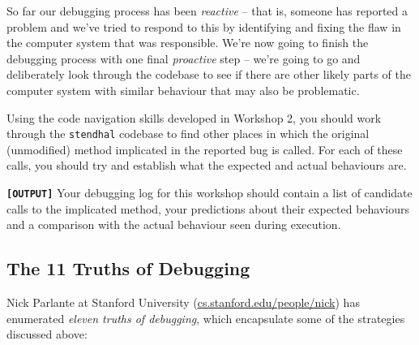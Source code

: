 \documentclass[
]{book}
\begin{document}
So far our debugging process has been \emph{reactive} -- that is, someone has reported a problem and we've tried to respond to this by identifying and fixing the flaw in the computer system that was responsible. We're now going to finish the debugging process with one final \emph{proactive} step -- we're going to go and deliberately look through the codebase to see if there are other likely parts of the computer system with similar behaviour that may also be problematic.

Using the code navigation skills developed in Workshop 2, you should work through the \texttt{stendhal} codebase to find other places in which the original (unmodified) method implicated in the reported bug is called. For each of these calls, you should try and establish what the expected and actual behaviours are.

\textbf{\texttt{{[}OUTPUT{]}}} Your debugging log for this workshop should contain a list of candidate calls to the implicated method, your predictions about their expected behaviours and a comparison with the actual behaviour seen during execution.

\hypertarget{truths}{%
\subsection{The 11 Truths of Debugging}\label{truths}}

Nick Parlante at Stanford University (\href{https://cs.stanford.edu/people/nick/}{cs.stanford.edu/people/nick}) has enumerated \emph{eleven truths of debugging}, which encapsulate some of the strategies discussed above:
\end{document}
